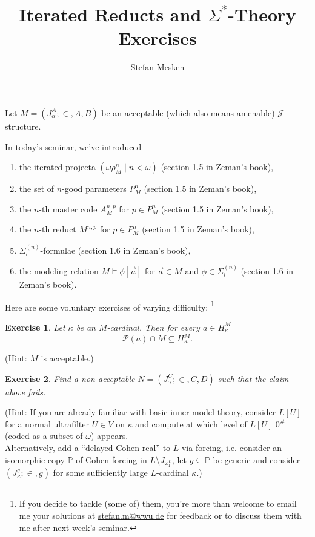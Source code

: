 \documentclass[12pt,a4paper]{article}
\theoremstyle{nicestyle}
\newtheorem{exercise}{Exercise}[subsection]
\begin{document}
\author{Stefan Mesken}
\title{Iterated Reducts and $\Sigma^{*}$-Theory \\
  Exercises}
\maketitle

Let $M = (J_{\alpha}^{A}; \in, A, B)$ be an acceptable
(which also means amenable) $\mathcal{J}$-structure.

In today's seminar, we've introduced
\begin{enumerate}
\item the iterated projecta $(\omega\rho^{n}_{M} \mid n < \omega)$ (section 1.5 in Zeman's book),
\item the set of $n$-good parameters $P^{n}_{M}$ (section 1.5 in Zeman's book),
\item the $n$-th master code $A^{n,p}_{M}$ for
  $p \in P^{n}_{M}$ (section 1.5 in Zeman's book),
\item the $n$-th reduct $M^{n,p}$ for $p \in P^{n}_{M}$ (section 1.5 in Zeman's book),
\item $\Sigma^{(n)}_{l}$-formulae (section 1.6 in Zeman's book),
\item the modeling relation $M \models \phi[\vec{a}]$ for
  $\vec{a} \in M$ and $\phi \in \Sigma^{(n)}_{l}$ (section 1.6 in
  Zeman's book).
\end{enumerate}

Here are some voluntary exercises of varying difficulty: \footnote{If
  you decide to tackle (some of) them, you're more than welcome to
  email me your solutions at
  \href{mailto:stefan.m@wwu.de}{stefan.m@wwu.de} for feedback or to
  discuss them with me after next week's seminar.}

\begin{exercise}
  Let $\kappa$ be an $M$-cardinal. Then for every
  $a \in H^{M}_{\kappa}$
  \[
    \mathcal{P}(a) \cap M \subseteq H_{\kappa}^{M}.
  \]
\end{exercise}

(Hint: $M$ is acceptable.)

\begin{exercise}
  Find a non-acceptable $N = (J^{C}_{\gamma}; \in, C, D)$ such that
  the claim above fails.
\end{exercise}

(Hint: If you are already familiar with basic inner model theory,
consider $L[U]$ for a normal ultrafilter $U \in V$ on $\kappa$ and
compute at which level of $L[U]$ $0^{\#}$ (coded as a subset of
$\omega$) appears. \\
Alternatively, add a ``delayed Cohen real'' to $L$ via forcing,
i.e. consider an isomorphic copy $\mathbb{P}$ of Cohen forcing in
$L \setminus J_{\omega_{1}^{L}}$, let $g \subseteq \mathbb{P}$ be
generic and consider $(J^{g}_{\kappa}; \in, g)$ for some sufficiently
large $L$-cardinal $\kappa$.)
\end{document}
